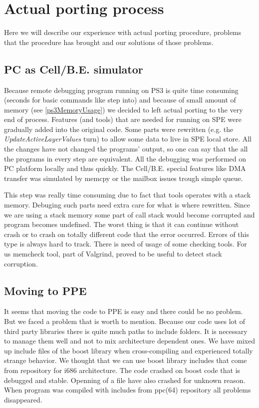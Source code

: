 \section{Actual porting process}

\par
Here we will describe our experience with actual porting procedure, problems that the procedure has brought and our solutions of those problems.

\subsection{PC as Cell/B.E. simulator}

\par
Because remote debugging program running on PS3 is quite time consuming (seconds for basic commands like step into) and because of small amount of memory (see \ref{ps3MemoryUsage}) we decided to left actual porting to the very end of process.
Features (and tools) that are needed for running on SPE were gradually added into the original code.
Some parts were rewritten (e.g. the \emph{UpdateActiveLayerValues} turn) to allow some data to live in SPE local store.
All the changes have not changed the programs' output, so one can say that the all the programs in every step are equivalent.
All the debugging was performed on PC platform locally and thus quickly.
The Cell/B.E. special features like DMA transfer was simulated by memcpy or the mailbox issues trough simple queue.

\par
This step was really time consuming due to fact that tools operates with a stack memory.
Debuging such parts need extra care for what is where rewritten.
Since we are using a stack memory some part of call stack would become corrupted and program becomes undefined.
The worst thing is that it can continue without crash or to crash on totally different code that the error occurred.
Errors of this type is always hard to track.
There is need of usage of some checking tools.
For us memcheck tool, part of Valgrind, proved to be useful to detect stack corruption.

\subsection{Moving to PPE}

\par
It seems that moving the code to PPE is easy and there could be no problem.
But we faced a problem that is worth to mention.
Because our code uses lot of third party libraries there is quite much paths to include folders.
It is necessary to manage them well and not to mix architecture dependent ones.
We have mixed up include files of the boost library when cross-compiling and experienced totally strange behavior.
We thought that we can use boost library includes that come from repository for i686 architecture.
The code crashed on boost code that is debugged and stable.
Openning of a file have also crashed for unknown reason.
When program was compiled with includes from ppc(64) repository all problems disappeared.

